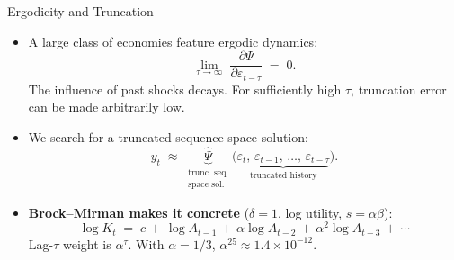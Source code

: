 \documentclass[aspectratio=169,11pt]{beamer}
\newcommand{\emphc}[1]{\textcolor{harvardcrimson}{#1}}
\begin{document}
\begin{frame}{Ergodicity and Truncation}
\small
\begin{itemize}\itemsep10pt
\item A large class of economies feature \emphc{ergodic dynamics}:
\[
\lim_{\tau \to \infty}\;\frac{\partial \Psi}{\partial \varepsilon_{t-\tau}} \;=\; 0.
\]
The influence of past shocks decays.  For sufficiently high $\tau$, truncation error can be made arbitrarily low.

\item We search for a \emphc{truncated} sequence-space solution:
\[
y_t \;\approx\; \underbrace{\widehat\Psi}_{\substack{\text{trunc.\ seq.}\\ \text{space sol.}}}\!\bigl(\underbrace{\varepsilon_t,\,\varepsilon_{t-1},\,\ldots,\,\varepsilon_{t-\tau}}_{\text{truncated history}}\bigr).
\]

\item \textbf{Brock--Mirman makes it concrete} ($\delta = 1$, log utility, $s = \alpha\beta$):
\[
\log K_t \;=\; c \,+\, \log A_{t-1} \,+\, \alpha \log A_{t-2} \,+\, \alpha^2 \log A_{t-3} \,+\, \cdots
\]
Lag-$\tau$ weight is $\alpha^\tau$.  With $\alpha = 1/3$, $\alpha^{25} \approx 1.4\!\times\!10^{-12}$.
\end{itemize}
\end{frame}


\end{document}

